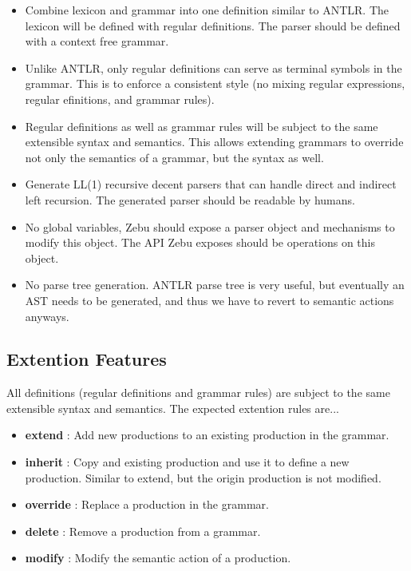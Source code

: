 \documentclass[12pt]{article}
\begin{document}
\begin{itemize}

\item Combine lexicon and grammar into one definition similar to ANTLR. The lexicon will be defined with regular definitions. The parser should be defined with a context free grammar.

\item Unlike ANTLR, only regular definitions can serve as terminal symbols in the grammar. This is to enforce a consistent style (no mixing regular expressions, regular efinitions, and grammar rules).

\item Regular definitions as well as grammar rules will be subject to the same extensible syntax and semantics. This allows extending grammars to override not only the semantics of a grammar, but the syntax as well.

\item Generate LL(1) recursive decent parsers that can handle direct and indirect left recursion. The generated parser should be readable by humans.

\item No global variables, Zebu should expose a parser object and mechanisms to modify this object. The API Zebu exposes should be operations on this object.

\item No parse tree generation. ANTLR parse tree is very useful, but eventually an AST needs to be generated, and thus we have to revert to semantic actions anyways.

\end{itemize}

\subsection{Extention Features}

All definitions (regular definitions and grammar rules) are subject to the same extensible syntax and semantics. The expected extention rules are...

\begin{itemize}

\item \textbf{extend} : Add new productions to an existing production in the grammar.

\item \textbf{inherit} : Copy and existing production and use it to define a new production. Similar to extend, but the origin production is not modified.

\item \textbf{override} : Replace a production in the grammar.

\item \textbf{delete} : Remove a production from a grammar.

\item \textbf{modify} : Modify the semantic action of a production.

\end{itemize}
\end{document}
